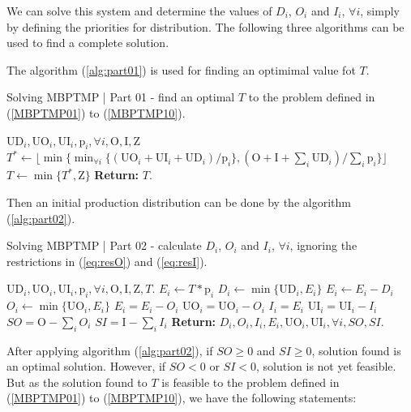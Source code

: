 \documentclass[authoryear,manuscript,12pt]{elsarticle}
\begin{document}
We can solve this system and determine the values of $D_i$, $O_i$ and $I_i$, $\forall i$, simply by defining the priorities for distribution. The following three algorithms can be used to find a complete solution.

The algorithm (\ref{alg:part01}) is used for finding an optimimal value fot $T$. 

\begin{algorithm}
\caption{Solving MBPTMP | Part 01 - find an optimal $T$ to the problem defined in (\ref{MBPTMP01}) to (\ref{MBPTMP10}).}\label{alg:part01}
\begin{algorithmic}
	\Require $\textrm{UD}_i, \textrm{UO}_i, \textrm{UI}_i, \textrm{p}_i, \forall i, \textrm{O}, \textrm{I}, \textrm{Z}$
	\State $T^* \gets \lfloor{\min \{\min_{\forall i} \{(\textrm{UO}_i + \textrm{UI}_i + \textrm{UD}_i) / \textrm{p}_i\},(\textrm{O} + \textrm{I} + \sum_i \textrm{UD}_i) / \sum_i {\textrm{p}_i}\}}\rfloor$
	\State $T \gets \min \{T^* , \textrm{Z}\}$
\State \textbf{Return:} $T$.
\end{algorithmic}
\end{algorithm}

Then an initial production distribution can be done by the algorithm (\ref{alg:part02}). 

\begin{algorithm}
\caption{Solving MBPTMP | Part 02 - calculate $D_i$, $O_i$ and $I_i$, $\forall i$, ignoring the restrictions in (\ref{eq:resO}) and (\ref{eq:resI}).}\label{alg:part02}
\begin{algorithmic}
	\Require $\textrm{UD}_i, \textrm{UO}_i, \textrm{UI}_i, \textrm{p}_i, \forall i, \textrm{O}, \textrm{I}, \textrm{Z}, T$.
		\State $E_i \gets T * \textrm{p}_i$
		\State $D_i \gets \min \{\textrm{UD}_i, E_i\}$
		\State $E_i \gets E_i - D_i$
		\State $O_i \gets \min \{\textrm{UO}_i, E_i\}$
		\State $E_i = E_i - O_i$
		\State $\textrm{UO}_i = \textrm{UO}_i - O_i$
		\State $I_i = E_i$
		\State $\textrm{UI}_i = \textrm{UI}_i - I_i$
	\EndFor
	\State $SO = \textrm{O} - \sum_i{O_i}$
	\State $SI = \textrm{I} - \sum_i{I_i}$
	\State \textbf{Return:} $D_i, O_i, I_i, E_i, \textrm{UO}_i, \textrm{UI}_i, \forall i, SO, SI$.
\end{algorithmic}
\end{algorithm}

After applying algorithm (\ref{alg:part02}), if $SO \geq 0$ and $SI \geq 0$, solution found is an optimal solution. However, if $SO < 0$ or $SI <0$, solution is not yet feasible. But as the solution found to $T$ is feasible to the problem defined in (\ref{MBPTMP01}) to (\ref{MBPTMP10}), we have the following statements:
\end{document}

